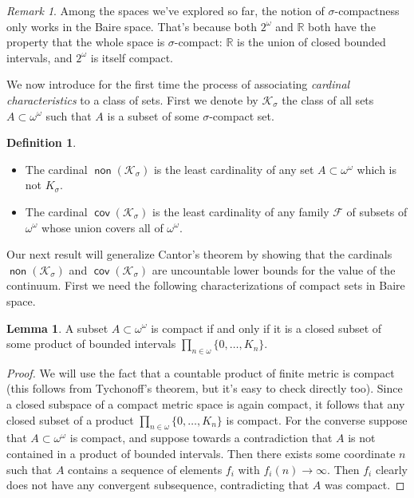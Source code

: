 \documentclass[11pt,oneside]{amsart}
\newcommand{\RR}{\mathbb R}
\DeclareMathOperator{\non}{\mathsf{non}}
\DeclareMathOperator{\cov}{\mathsf{cov}}
\theoremstyle{definition}
\newtheorem{lem}[thm]{Lemma}
\theoremstyle{definition}
\newtheorem{defn}[thm]{Definition}
\theoremstyle{remark}
\newtheorem{rem}[thm]{Remark}
\begin{document}
\begin{rem}
  Among the spaces we've explored so far, the notion of $\sigma$-compactness only works in the Baire space. That's because both $2^\omega$ and $\RR$ both have the property that the whole space is $\sigma$-compact: $\RR$ is the union of closed bounded intervals, and $2^\omega$ is itself compact.
\end{rem}

We now introduce for the first time the process of associating \emph{cardinal characteristics} to a class of sets. First we denote by $\mathcal K_\sigma$ the class of all sets $A\subset\omega^\omega$ such that $A$ is a subset of some $\sigma$-compact set.

\begin{defn}
  \begin{itemize}
  \item The cardinal $\non(\mathcal K_\sigma)$ is the least cardinality of any set $A\subset\omega^\omega$ which is not $K_\sigma$.
  \item The cardinal $\cov(\mathcal K_\sigma)$ is the least cardinality of any family $\mathcal F$ of subsets of $\omega^\omega$ whose union covers all of $\omega^\omega$.
  \end{itemize}
\end{defn}

Our next result will generalize Cantor's theorem by showing that the cardinals $\non(\mathcal K_\sigma)$ and $\cov(\mathcal K_\sigma)$ are uncountable lower bounds for the value of the continuum. First we need the following characterizations of compact sets in Baire space.

\begin{lem}
  \label{lem:baire-compact}
  A subset $A\subset\omega^\omega$ is compact if and only if it is a closed subset of some product of bounded intervals $\prod_{n\in\omega}\{0,\ldots,K_n\}$.
\end{lem}

\begin{proof}
  We will use the fact that a countable product of finite metric is compact (this follows from Tychonoff's theorem, but it's easy to check directly too). Since a closed subspace of a compact metric space is again compact, it follows that any closed subset of a product $\prod_{n\in\omega}\{0,\ldots,K_n\}$ is compact. For the converse suppose that $A\subset\omega^\omega$ is compact, and suppose towards a contradiction that $A$ is not contained in a product of bounded intervals. Then there exists some coordinate $n$ such that $A$ contains a sequence of elements $f_i$ with $f_i(n)\to\infty$. Then $f_i$ clearly does not have any convergent subsequence, contradicting that $A$ was compact.
\end{proof}
\end{document}
